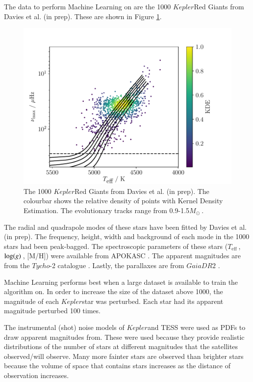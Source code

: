 \documentclass[a4paper,fleqn,usenatbib,useAMS]{mnras}
\newcommand{\teff}{\ensuremath{T_{\textrm{eff}}\:}}
\newcommand{\kep}{\ensuremath{Kepler}\:}
\newcommand{\msol}{\ensuremath{M_{\odot}\:}}
\newcommand{\logg}{\ensuremath{{\rm log}(g)\:}}
\begin{document}
The data to perform Machine Learning on are the 1000 \kep Red Giants from Davies et al. (in prep). These are shown in Figure \ref{fig:dataset}.
\begin{figure}
	\centering
	\includegraphics[scale=0.5]{Plot1_HR.pdf}
	\caption{The 1000 \kep Red Giants from Davies et al. (in prep). The colourbar shows the relative density of points with Kernel Density Estimation. The evolutionary tracks range from 0.9-1.5\msol.}	
	\label{fig:dataset}
\end{figure}
The radial and quadrapole modes of these stars have been fitted by Davies et al. (in prep). The frequency, height, width and background of each mode in the 1000 stars had been peak-bagged. The spectroscopic parameters of these stars (\teff, \logg, [M/H]) were available from APOKASC \citet{pinsonneault_apokasc_2014}. The apparent magnitudes are from the $Tycho$-2 catalogue \citet{hog_tycho-2_2000}. Lastly, the parallaxes are from $Gaia DR2$ \citet{lindegren_gaia_2018}.

Machine Learning performs best when a large dataset is available to train the algorithm on. In order to increase the size of the dataset above 1000, the magnitude of each \kep star was perturbed. Each star had its apparent magnitude perturbed 100 times. 

The instrumental (shot) noise models of \kep and TESS were used as PDFs to draw apparent magnitudes from. These were used because they provide realistic distributions of the number of stars at different magnitudes that the satellites observed/will observe. Many more fainter stars are observed than brighter stars because the volume of space that contains stars increases as the distance of observation increases.
\end{document}
